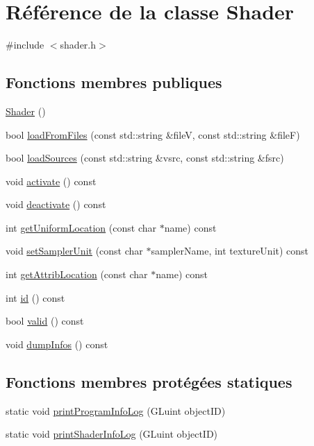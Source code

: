 \hypertarget{class_shader}{}\section{Référence de la classe Shader}
\label{class_shader}


{\ttfamily \#include $<$shader.\+h$>$}

\subsection*{Fonctions membres publiques}
\begin{DoxyCompactItemize}
\item 
\hyperlink{class_shader_a0d654ebaca4e0555197c0724c6d30610}{Shader} ()
\item 
bool \hyperlink{class_shader_ab3326b4493672d0e456e05d9b64c7b28}{load\+From\+Files} (const std\+::string \&fileV, const std\+::string \&fileF)
\item 
bool \hyperlink{class_shader_ac849c6315a283ebf04571ca62000c187}{load\+Sources} (const std\+::string \&vsrc, const std\+::string \&fsrc)
\item 
void \hyperlink{class_shader_aac46b11981aef0616f45e191201f519a}{activate} () const
\item 
void \hyperlink{class_shader_ae7a6e4cdb7719dc501a61d6ef732ad98}{deactivate} () const
\item 
int \hyperlink{class_shader_ae42ef5734471e2cdf1e5045c8883961d}{get\+Uniform\+Location} (const char $\ast$name) const
\item 
void \hyperlink{class_shader_ae6ebc266e4706be4b040fe23aced651a}{set\+Sampler\+Unit} (const char $\ast$sampler\+Name, int texture\+Unit) const
\item 
int \hyperlink{class_shader_a4287e8012d956746f99cf8d1d6a126f8}{get\+Attrib\+Location} (const char $\ast$name) const
\item 
int \hyperlink{class_shader_ac6f8837bdac2997de1a79c9a518c664c}{id} () const
\item 
bool \hyperlink{class_shader_ade2fdfa75d4447eaac246b8d3b799cec}{valid} () const
\item 
void \hyperlink{class_shader_af4bd705b0eb25ec610dffb4b5d694641}{dump\+Infos} () const
\end{DoxyCompactItemize}
\subsection*{Fonctions membres protégées statiques}
\begin{DoxyCompactItemize}
\item 
static void \hyperlink{class_shader_ab46602912ae536c070edf4720a254c31}{print\+Program\+Info\+Log} (G\+Luint object\+ID)
\item 
static void \hyperlink{class_shader_af36e2a57d8f789e95b7d014a8ddfaf97}{print\+Shader\+Info\+Log} (G\+Luint object\+ID)
\end{DoxyCompactItemize}
